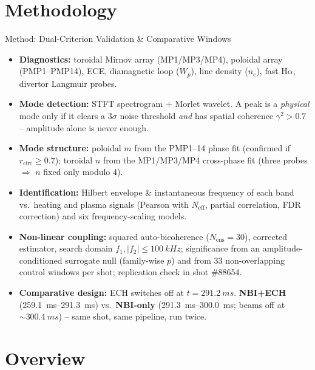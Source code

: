 \documentclass[aspectratio=169,xcolor=table]{beamer}
\begin{document}
\section{Methodology}

\begin{frame}{Method: Dual-Criterion Validation \& Comparative Windows}
    \small
    \begin{itemize}[<+->]
        \item \textbf{Diagnostics:} toroidal Mirnov array (MP1/MP3/MP4), poloidal
        array (PMP1--PMP14), ECE, diamagnetic loop ($W_p$), line density ($n_e$),
        fast H$\alpha$, divertor Langmuir probes.
        \item \textbf{Mode detection:} STFT spectrogram + Morlet wavelet. A peak is a
        \emph{physical} mode only if it clears a $3\sigma$ noise threshold \emph{and} has
        spatial coherence $\gamma^2>0.7$ -- amplitude alone is never enough.
        \item \textbf{Mode structure:} poloidal $m$ from the PMP1--14 phase fit (confirmed
        if $r_{\text{circ}}\ge0.7$); toroidal $n$ from the MP1/MP3/MP4 cross-phase fit
        (three probes $\Rightarrow$ $n$ fixed only modulo 4).
        \item \textbf{Identification:} Hilbert envelope \& instantaneous frequency of each band vs.\
        heating and plasma signals (Pearson with $N_{\text{eff}}$, partial correlation,
        FDR correction) and six frequency-scaling models.
        \item \textbf{Non-linear coupling:} squared auto-bicoherence ($N_{\text{ens}}=30$),
        corrected estimator, search domain $f_1,|f_2|\le\SI{100}{kHz}$; significance from an amplitude-conditioned surrogate null (family-wise $p$) and from 33 non-overlapping control windows per shot; replication check in shot \#88654.
        \item \textbf{Comparative design:} ECH switches off at $t=\SI{291.2}{ms}$.
        \textbf{NBI+ECH} (\SIrange{259.1}{291.3}{ms}) vs.\ \textbf{NBI-only}
        (\SIrange{291.3}{300.0}{ms}; beams off at ${\sim}\SI{300.4}{ms}$) -- same shot,
        same pipeline, run twice.
    \end{itemize}
\end{frame}

\section{Overview}
\end{document}
